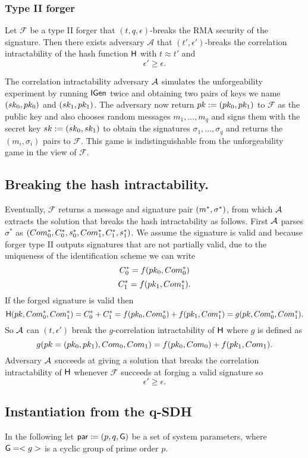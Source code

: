 \subsubsection{Type II forger} 
\begin{lemma}
Let $\mathcal{F}$ be a type II forger that $(t,q,\epsilon)$-breaks the RMA security of the signature. Then there exists adversary $\mathcal{A}$ that $(t',\epsilon')$-breaks the correlation intractability of the hash function $\mathsf{H}$ with 
$t \approx t'$ and 
$$\epsilon' \geq \epsilon.$$
\end{lemma}

The correlation intractability adversary $\mathcal{A}$ simulates the unforgeability experiment by
running $\mathsf{IGen}$ twice and obtaining two pairs of keys we name $(sk_0,pk_0)$ and $(sk_1, pk_1)$. The adversary now return 
$pk := (pk_0, pk_1)$ to $\mathcal{F}$ as the public key and also
chooses random messages $m_1,...,m_q$ and signs them with the secret key 
$sk := (sk_0, sk_1)$ to obtain the signatures $\sigma_1,...,\sigma_q$ and returns the $(m_i,\sigma_i)$ pairs to $\mathcal{F}$. This game is indistinguishable from the unforgeability game in the view of $\mathcal{F}$.

\subsection*{Breaking the hash intractability.}
Eventually, $\mathcal{F}$ returns a message and signature pair 
 $(m^*, \sigma^*)$, from which $\mathcal{A}$ extracts the solution that breaks the hash intractability as follows. First $\mathcal{A}$ parses $\sigma^*$
as
$(Com^*_{0},C^*_{0},s^*_{0}, Com^*_{1}, C^*_{1},s^*_{1})$.
We assume the signature is valid and because forger type II outputs signatures that are not partially valid, due to the uniqueness of the identification scheme
 we can write
$$C^*_0 = f(pk_0,Com^*_0)$$
$$C^*_1 = f(pk_1,Com^*_1).$$
If the forged signature is valid then 
$$\mathsf{H}(pk,Com^*_0,Com^*_1)=C^*_0+C^*_1 =  f(pk_0,Com^*_0)+ f(pk_1,Com^*_1) = g(pk,Com^*_0,Com^*_1).$$
So $\mathcal{A}$ can $(t,\epsilon')$ break the $g$-correlation intractability of $\mathsf{H}$ where $g$ is defined as 
$$g(pk=(pk_0,pk_1), Com_0, Com_1) =  f(pk_0,Com_0)+ f(pk_1,Com_1).$$
Adversary $\mathcal{A}$ succeeds at giving a solution that breaks the correlation intractability of $\mathsf{H}$ whenever $\mathcal{F}$ succeeds at forging a valid signature so
$$\epsilon'\geq\epsilon.$$



\subsection{Instantiation from the q-SDH}
In the following let $\mathsf{par} \coloneqq (p,q,\mathsf{G}) $ be a set of system parameters, where 
$\mathsf{G} = <g>$ is a cyclic group of prime order $p$.

